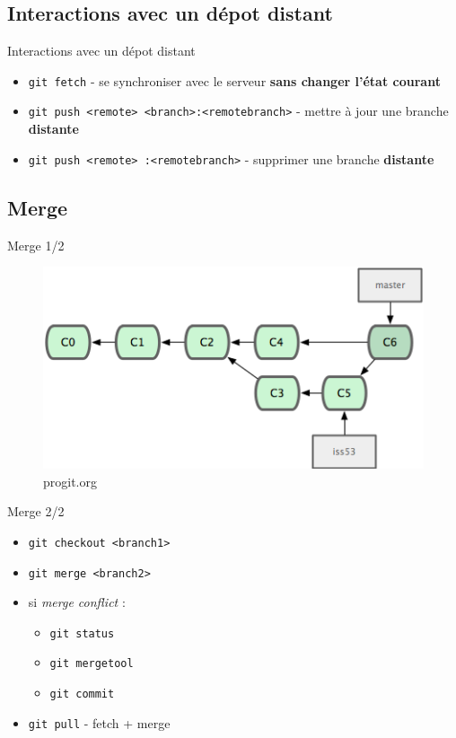 \documentclass{beamer}
\begin{document}
\subsection*{Interactions avec un dépot distant}
\begin{frame}{Interactions avec un dépot distant}
  \begin{itemize}
  \item \lstinline|git fetch| - se synchroniser avec le serveur
    \textbf{sans changer l'état courant}
  \item \lstinline|git push <remote> <branch>:<remotebranch>| - mettre
    à jour une branche \textbf{distante}
  \item \lstinline|git push <remote> :<remotebranch>| - supprimer une
    branche \textbf{distante}
  \end{itemize}
\end{frame}

\subsection*{Merge}
\begin{frame}{Merge 1/2}
  \begin{figure}
    \begin{center}
      \includegraphics[scale=1]{img/Merge.png}
    \end{center}
    \caption{progit.org}
  \end{figure}
\end{frame}

\begin{frame}{Merge 2/2}
  \begin{itemize}
  \item \lstinline|git checkout <branch1>|
  \item \lstinline|git merge <branch2>|
  \item si \emph{merge conflict} :
    \begin{itemize}
    \item[] \lstinline|git status|
    \item[] \lstinline|git mergetool|
    \item[] \lstinline|git commit|
    \end{itemize}
  \item \lstinline|git pull| - fetch + merge
  \end{itemize}
\end{frame}
\end{document}
